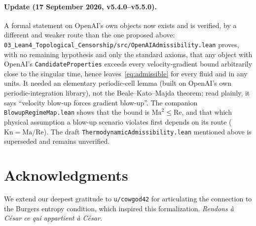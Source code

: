 \documentclass[11pt]{article}
\begin{document}
\paragraph{Update (17 September 2026, v5.4.0--v5.5.0).} A formal statement on OpenAI's own objects now exists and is verified, by a different and weaker route than the one proposed above: \texttt{03\_Lean4\_Topological\_Censorship/src/OpenAIAdmissibility.lean} proves, with no remaining hypothesis and only the standard axioms, that any object with OpenAI's \texttt{CandidateProperties} exceeds every velocity-gradient bound arbitrarily close to the singular time, hence leaves~\eqref{eq:admissible} for every fluid and in any units. It needed an elementary periodic-cell lemma (built on OpenAI's own periodic-integration library), not the Beale--Kato--Majda theorem; read plainly, it says ``velocity blow-up forces gradient blow-up''. The companion \texttt{BlowupRegimeMap.lean} shows that the bound is $\mathrm{Ma}^2\le\mathrm{Re}$, and that which physical assumption a blow-up scenario violates first depends on its route ($\mathrm{Kn}=\mathrm{Ma}/\mathrm{Re}$). The draft \texttt{ThermodynamicAdmissibility.lean} mentioned above is superseded and remains unverified.

\section{Acknowledgments}
We extend our deepest gratitude to \texttt{u/cowgod42} for articulating the connection to the Burgers entropy condition, which inspired this formalization. \textit{Rendons \`a C\'esar ce qui appartient \`a C\'esar.}
\end{document}
